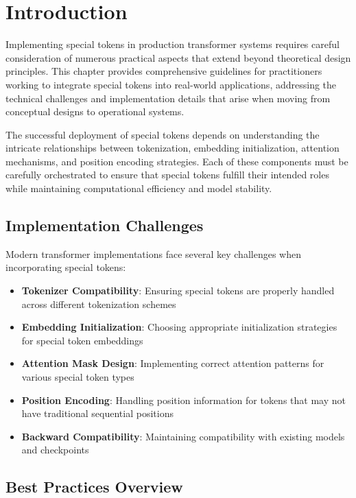 
\section{Introduction}

Implementing special tokens in production transformer systems requires careful consideration of numerous practical aspects that extend beyond theoretical design principles. This chapter provides comprehensive guidelines for practitioners working to integrate special tokens into real-world applications, addressing the technical challenges and implementation details that arise when moving from conceptual designs to operational systems.

The successful deployment of special tokens depends on understanding the intricate relationships between tokenization, embedding initialization, attention mechanisms, and position encoding strategies. Each of these components must be carefully orchestrated to ensure that special tokens fulfill their intended roles while maintaining computational efficiency and model stability.

\subsection{Implementation Challenges}

Modern transformer implementations face several key challenges when incorporating special tokens:

\begin{itemize}
\item \textbf{Tokenizer Compatibility}: Ensuring special tokens are properly handled across different tokenization schemes
\item \textbf{Embedding Initialization}: Choosing appropriate initialization strategies for special token embeddings
\item \textbf{Attention Mask Design}: Implementing correct attention patterns for various special token types
\item \textbf{Position Encoding}: Handling position information for tokens that may not have traditional sequential positions
\item \textbf{Backward Compatibility}: Maintaining compatibility with existing models and checkpoints
\end{itemize}

\subsection{Best Practices Overview}

